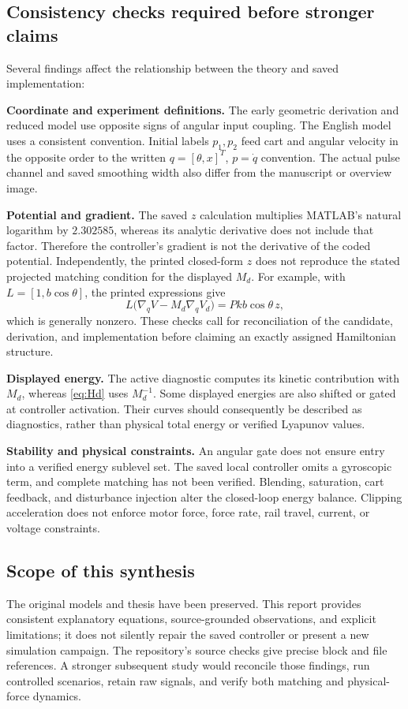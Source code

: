 \documentclass[11pt,a4paper]{article}
\newcommand{\topic}[1]{\subsection*{\color{teal}#1}}
\begin{document}
\topic{Consistency checks required before stronger claims}
Several findings affect the relationship between the theory and saved implementation:

\textbf{Coordinate and experiment definitions.} The early geometric derivation and reduced model use opposite signs of angular input coupling. The English model uses a consistent convention. Initial labels $p_1,p_2$ feed cart and angular velocity in the opposite order to the written $q=[\theta,x]^T$, $p=\dot q$ convention. The actual pulse channel and saved smoothing width also differ from the manuscript or overview image.

\textbf{Potential and gradient.} The saved $z$ calculation multiplies MATLAB's natural logarithm by $2.302585$, whereas its analytic derivative does not include that factor. Therefore the controller's gradient is not the derivative of the coded potential. Independently, the printed closed-form $z$ does not reproduce the stated projected matching condition for the displayed $M_d$. For example, with $L=[1,b\cos\theta]$, the printed expressions give
\[
 L\big(\nabla_q V-M_d\nabla_q V_d\big)
       =Pk b\cos\theta\,z,
\]
which is generally nonzero. These checks call for reconciliation of the candidate, derivation, and implementation before claiming an exactly assigned Hamiltonian structure.

\textbf{Displayed energy.} The active diagnostic computes its kinetic contribution with $M_d$, whereas \eqref{eq:Hd} uses $M_d^{-1}$. Some displayed energies are also shifted or gated at controller activation. Their curves should consequently be described as diagnostics, rather than physical total energy or verified Lyapunov values.

\textbf{Stability and physical constraints.} An angular gate does not ensure entry into a verified energy sublevel set. The saved local controller omits a gyroscopic term, and complete matching has not been verified. Blending, saturation, cart feedback, and disturbance injection alter the closed-loop energy balance. Clipping acceleration does not enforce motor force, force rate, rail travel, current, or voltage constraints.

\topic{Scope of this synthesis}
The original models and thesis have been preserved. This report provides consistent explanatory equations, source-grounded observations, and explicit limitations; it does not silently repair the saved controller or present a new simulation campaign. The repository's source checks give precise block and file references. A stronger subsequent study would reconcile those findings, run controlled scenarios, retain raw signals, and verify both matching and physical-force dynamics.
\end{document}
